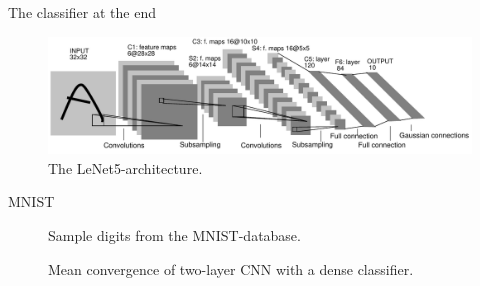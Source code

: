 \documentclass{beamer}
\begin{document}
    \begin{frame}{The classifier at the end}
        \begin{figure}%
				\centering
				\includegraphics[width=1.0\linewidth]{figures/lenet5.pdf}
        \caption{The LeNet5-architecture\cite{lecun1989handwritten}.}
        \end{figure}
    \end{frame}

%
%

    \begin{frame}{MNIST}
        \begin{figure}
            
            \caption{Sample digits from the MNIST-database.}
        \end{figure}
        \begin{figure}
            
            \caption{Mean convergence of two-layer CNN with a dense classifier.}
        \end{figure}
    \end{frame}
\end{document}
